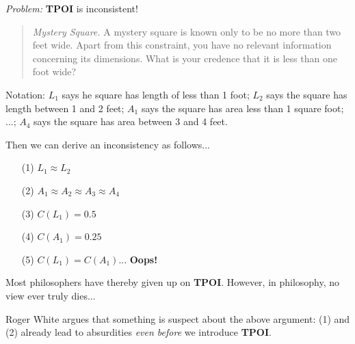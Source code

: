 \documentclass{tufte-handout}
\begin{document}

\noindent \textit{Problem:} \textbf{TPOI} is inconsistent! 

\begin{quote}
    \textit{Mystery Square.} A mystery square is  
    known only to be no more than two feet wide. Apart from this constraint, you have no relevant information concerning its dimensions. What is your credence that it is less than one foot wide? 
\end{quote}

\noindent Notation: $L_1$ says he square has length of less than 1 foot; $L_2$ says the square has length between 1 and 2 feet;  $A_1$ says the square has area less than 1 square foot; ...; $A_4$ says the square has area between 3 and 4 feet.

\vspace{2mm}

\noindent Then we can derive an inconsistency as follows...

\begin{enumerate}
    \item[(1)] $L_1\approx L_2$
    \item[(2)] $A_1\approx A_2\approx A_3\approx A_4$
    \item[(3)] $C(L_1)=0.5$
    \item[(4)] $C(A_1)=0.25$
    \item[(5)] $C(L_1)=C(A_1)$... \textbf{Oops!}
\end{enumerate}


\noindent Most philosophers have thereby given up on \textbf{TPOI}. However, in philosophy, no view ever truly dies...

\vspace{2mm}

 \noindent Roger White argues that something is suspect about the above argument: (1) and (2) already lead to absurdities \textit{even before} we introduce \textbf{TPOI}.
\end{document}
